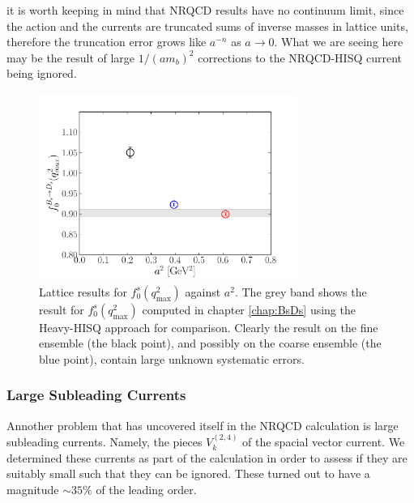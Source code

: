 it is worth keeping in mind that NRQCD results have no continuum limit, since the action and the currents are truncated sums of inverse masses in lattice units, therefore the truncation error grows like $a^{-n}$ as $a\to 0$. What we are seeing here may be the result of large $1/(am_b)^2$ corrections to the NRQCD-HISQ current being ignored.

\begin{figure}[htb!]
  \vspace{-20pt}
  \begin{center}
    \includegraphics[width=0.75\textwidth]{images/nrqcd/BsDs_f0q2max.pdf}
  \end{center}
  \caption{Lattice results for $f_0^s(q^2_{\text{max}})$ against $a^2$. The grey band shows the result for $f_0^s(q^2_{\text{max}})$ computed in chapter \ref{chap:BsDs} using the Heavy-HISQ approach for comparison. Clearly the result on the fine ensemble (the black point), and possibly on the coarse ensemble (the blue point), contain large unknown systematic errors. \label{fig:BsDs_f0q2max}}

\end{figure}

\subsubsection{Large Subleading Currents}

Annother problem that has uncovered itself in the NRQCD calculation is large subleading currents. Namely, the pieces $V^{(2,4)}_k$ of the spacial vector current. We determined these currents as part of the calculation in order to assess if they are suitably small such that they can be ignored. These turned out to have a magnitude $\sim 35\%$ of the leading order.

